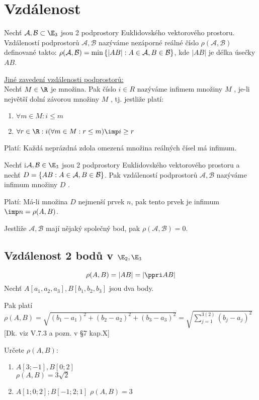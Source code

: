 
\section{Vzdálenost}
\def\mc{\mathcal}
\Def Nechť $\mathcal A,\mathcal B\subset \E_3$
 jsou 2 podprostory Euklidovského vektorového prostoru.
 Vzdáleností podprostorů $\mathcal A,\mathcal B$ nazýváme nezáporné reálné číslo $\rho( \mathcal A,\mathcal B)$ definované
  takto: $\rho(\mathcal A,\mathcal B) =  \min\left\{{ |AB| : A\in \mathcal A, B \in \mathcal B}\right\}$, kde $|AB|$ je délka úsečky $AB$.

  \Poz
  \underline{  Jiné zavedení vzdálenosti podprostorů:}\\
Nechť $M \in \R$ je množina. Pak číslo $i \in R$ nazýváme infimem množiny $M$ , je-li
 největší dolní závorou množiny $M$ , tj. jestliže platí:
 \begin{enumerate}
	 \item $\forall m \in M: i\le m$
	 \item $\forall r \in \R : i(\forall m \in M : r\le m) \imp i \ge r$
 \end{enumerate}

 Platí: Každá neprázdná zdola omezená množina reálných čísel má infimum. 

 Nechť i$\mc A,\mc B\in \E_3$
  jsou 2 podprostory Euklidovského vektorového prostoru a nechť
  $D=\zs{ AB : A\in\mc A, B\in\mc B}$. Pak vzdáleností podprostorů $\mc A,\mc B$ nazýváme infimum
  množiny $D$ .

  Platí: Má-li množina $D$ nejmenší prvek $n$, pak tento prvek je infimum
  $\imp n = \rho(A,B)$.
  
  \Poz Jestliže $\mc A,\mc B$ mají nějaký společný bod, pak $\rho( \mc A,\mc B) = 0$.

  \subsection{Vzdálenost 2 bodů v $\E_2,\E_3$}

  \Poz $$\rho(A,B) = |AB|  = |\ve{AB}|$$
  \V Nechť $A[a_1,a_2,a_3],B[b_1,b_2,b_3]$ jsou dva body.

  Pak platí $\rho(A,B) = \sqrt{(b_1-a_1)^2+(b_2-a_2)^2+(b_3-a_3)^2} = \sqrt{\sum_{j=1}^{3(2)}(b_j-a_j)^2}$ 
[Dk. viz V.7.3 a pozn. v §7 kap.X] 

\Pr Určete $\rho(A,B)$:
\begin{enumerate}
	\item $A[3;-1],B[0;2]$\\
		$\rho(A,B) = 3 \sqrt 2$
	\item $A[1;0;2];B[-1;2;1]$
		$\rho(A,B) = 3 $
\end{enumerate}
